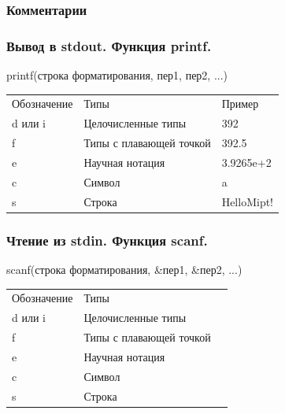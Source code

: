 \documentclass[12pt,pdf,hyperref={unicode}]{beamer}
\begin{document}
\begin{frame}
\frametitle{Комментарии}



\end{frame}

\begin{frame}
\frametitle{Вывод в stdout. Функция printf.}
printf(строка форматирования, пер1, пер2, ...)
\begin{center}
\begin{tabular}{ l l l }
  Обозначение & Типы & Пример \\
  d или i & Целочисленные типы & 392 \\
  f & Типы с плавающей точкой & 392.5 \\
  e & Научная нотация & 3.9265e+2 \\
  c & Символ & a \\
  s & Строка & HelloMipt! \\
\end{tabular}
\end{center}

\end{frame}

\begin{frame}
\frametitle{Чтение из stdin. Функция scanf.}
scanf(строка форматирования, \&пер1, \&пер2, ...)
\begin{center}
\begin{tabular}{ l l l }
  Обозначение & Типы\\
  d или i & Целочисленные типы  \\
  f & Типы с плавающей точкой \\
  e & Научная нотация \\
  c & Символ\\
  s & Строка\\
\end{tabular}
\end{center}
\end{frame}
\end{document}
